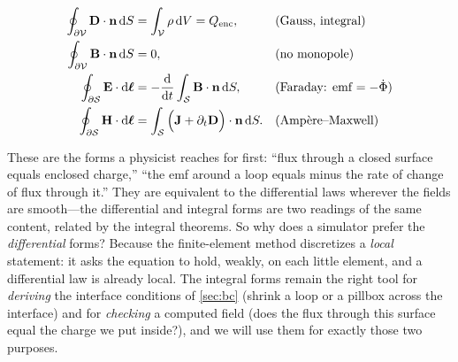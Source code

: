 \begin{align}
  \oint_{\partial \mathcal V} \mathbf{D}\cdot\mathbf{n}\,\mathrm{d}S &= \int_{\mathcal V}\rho\,\mathrm{d}V
    = Q_{\text{enc}}, & &\text{(Gauss, integral)}\\
  \oint_{\partial \mathcal V} \mathbf{B}\cdot\mathbf{n}\,\mathrm{d}S &= 0, & &\text{(no monopole)}\\
  \oint_{\partial \mathcal S} \mathbf{E}\cdot\mathrm{d}\bm\ell
    &= -\frac{\mathrm d}{\mathrm dt}\int_{\mathcal S}\mathbf{B}\cdot\mathbf{n}\,\mathrm{d}S,
    & &\text{(Faraday: emf $=-\dot\Phi$)}\\
  \oint_{\partial \mathcal S} \mathbf{H}\cdot\mathrm{d}\bm\ell
    &= \int_{\mathcal S}\Big(\mathbf{J}+\partial_t\mathbf{D}\Big)\cdot\mathbf{n}\,\mathrm{d}S.
    & &\text{(Amp\`ere--Maxwell)}
\end{align}

These are the forms a physicist reaches for first: ``flux through a closed
surface equals enclosed charge,'' ``the emf around a loop equals minus the rate
of change of flux through it.'' They are equivalent to the differential laws
wherever the fields are smooth---the differential and integral forms are two
readings of the same content, related by the integral theorems. So why does a
simulator prefer the \emph{differential} forms? Because the finite-element
method discretizes a \emph{local} statement: it asks the equation to hold,
weakly, on each little element, and a differential law is already local. The
integral forms remain the right tool for \emph{deriving} the interface
conditions of \cref{sec:bc} (shrink a loop or a pillbox across the interface)
and for \emph{checking} a computed field (does the flux through this surface
equal the charge we put inside?), and we will use them for exactly those two
purposes.

